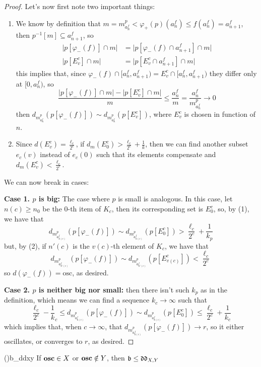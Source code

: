 \begin{proof}
    Let's now first note two important things:
    \begin{enumerate}
        \item We know by definition that $m=m_{a_n^f}^p<\varphi_+(p)(a_n^f)\leq f(a_n^f)=a_{n+1}^f$, then $p^{-1}[m]\subseteq a_{n+1}^f$, so
        \begin{align*}
            \lvert p[\varphi_-(f)]\cap m\rvert & = \lvert p[\varphi_-(f)\cap a_{n+1}^f]\cap m\rvert\\
            \lvert p[E_v^c]\cap m\rvert & = \lvert p[E_v^c\cap a_{n+1}^f]\cap m\rvert
        \end{align*}
        this implies that, since $\varphi_-(f)\cap [a_n^f,a_{n+1}^f)=E_v^c\cap[a_n^f,a_{n+1}^f)$ they differ only at $[0,a_n^f)$, so
        $$\frac{\lvert p[\varphi_-(f)]\cap m\rvert-\lvert p[E_v^c]\cap m\rvert}{m}\leq\frac{a_n^f}{m}=\frac{a_n^f}{m_{a_n^f}^p}\to0$$
        then $d_{m_{a_n^f}^p}(p[\varphi_-(f)])\sim d_{m_{a_n^f}^p}(p[E_v^c])$, where $E_v^c$ is chosen in function of $n$.
        \item Since $d(E_v^c)=\frac{\ell_c}{2^c}$, if $d_m(E_0^c)>\frac{\ell_c}{2^c}+\frac1k$, then we can find another subset $e_c(v)$ instead of $e_c(0)$ such that its elements compensate and $d_m(E_v^c)<\frac{\ell_c}{2^c}$.
    \end{enumerate}
    We can now break in cases:

    \textbf{Case 1. $p$ is big:} The case where $p$ is small is analogous. In this case, let $n(c)\geq n_0$ be the $0$-th item of $K_c$, then its corresponding set is $E_0^c$, so, by (1), we have that
    $$d_{m_{a_{n(c)}^f}^p}(p[\varphi_-(f)])\sim d_{m_{a_{n(c)}^f}^p}(p[E_0^c])>\frac{\ell_c}{2^c}+\frac1{k_p}$$
    but, by (2), if $n'(c)$ is the $v(c)$-th element of $K_c$, we have that
    $$d_{m_{a_{n'(c)}^f}^p}(p[\varphi_-(f)])\sim d_{m_{a_{n'(c)}^f}^p}(p[E_{v(c)}^c])<\frac{\ell_c}{2^c}$$
    so $d(\varphi_-(f))=\text{osc}$, as desired.

    \textbf{Case 2. $p$ is neither big nor small:} then there isn't such $k_p$ as in the definition, which means we can find a sequence $k_c\to\infty$ such that
    $$\frac{\ell_c}{2^c}-\frac1k_c\leq d_{m_{a_{n(c)}^f}^p}(p[\varphi_-(f)])\sim d_{m_{a_{n(c)}^f}^p}(p[E_0^c])\leq\frac{\ell_c}{2^c}+\frac1{k_c}$$
    which implies that, when $c\to\infty$, that $d_{m_{a_{n(c)}^f}^p}(p[\varphi_-(f)])\to r$, so it either oscillates, or converges to $r$, as desired.
\end{proof}

\begin{corollary}{(\cite{brech})}{b_ddxy}
    If $\mathbf{osc}\in X$ or $\mathbf{osc}\notin Y$, then $\mathfrak{b}\leq\mathfrak{dd}_{X,Y}$
\end{corollary}


